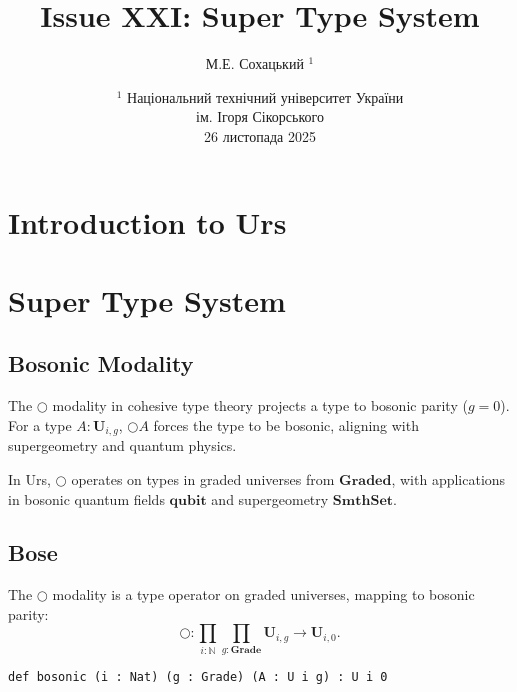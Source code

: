 \documentclass{article}
\begin{document}
\author { М.Е. Сохацький $^1$ }
\title { Issue XXI: Super Type System }
\date{ \small $^1$ Національний технічний університет України \\
       ім. Ігоря Сікорського \\
       26 листопада 2025 }
\maketitle

\begin{abstract}

\end{abstract}

\ifincludeTOC
  \tableofcontents
\fi


\newpage

\section{Introduction to Urs}

\section{Super Type System}

\subsection{Bosonic Modality}

The $\bigcirc$ modality in cohesive type theory projects a type to bosonic parity ($g = 0$).
For a type $A : \mathbf{U}_{i,g}$, $\bigcirc A$ forces the type to be bosonic,
aligning with supergeometry and quantum physics.

In Urs, $\bigcirc$ operates on types in graded universes from $\mathbf{Graded}$,
with applications in bosonic quantum fields $\mathbf{qubit}$ and supergeometry
$\mathbf{SmthSet}$.

\subsection{Bose}

\begin{definition}\label{def:bosonic-formation}
The $\bigcirc$ modality is a type operator on graded universes, mapping to bosonic parity:
\[
    \bigcirc : \prod_{i : \mathbb{N}} \prod_{g : \mathbf{Grade}}
    \mathbf{U}_{i,g} \to \mathbf{U}_{i,0}.
\]
\begin{lstlisting}[mathescape=true]
def bosonic (i : Nat) (g : Grade) (A : U i g) : U i 0
\end{lstlisting}
\end{definition}
\end{document}
